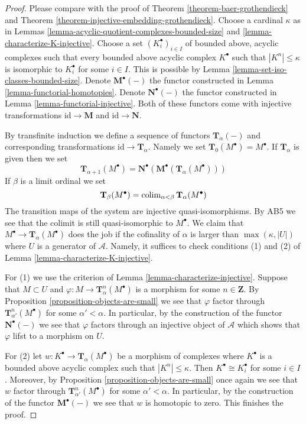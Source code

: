 \begin{proof}
Please compare with the proof of
Theorem \ref{theorem-baer-grothendieck}
and
Theorem \ref{theorem-injective-embedding-grothendieck}.
Choose a cardinal $\kappa$ as in
Lemmas \ref{lemma-acyclic-quotient-complexes-bounded-size} and
\ref{lemma-characterize-K-injective}.
Choose a set $(K_i^\bullet)_{i \in I}$
of bounded above, acyclic complexes
such that every bounded above acyclic complex $K^\bullet$
such that $|K^n| \leq \kappa$ is isomorphic to $K_i^\bullet$ for some
$i \in I$. This is possible by
Lemma \ref{lemma-set-iso-classes-bounded-size}.
Denote $\mathbf{M}^\bullet(-)$ the functor constructed in
Lemma \ref{lemma-functorial-homotopies}.
Denote $\mathbf{N}^\bullet(-)$ the functor constructed in
Lemma \ref{lemma-functorial-injective}.
Both of these functors come with injective transformations
$\text{id} \to \mathbf{M}$ and $\text{id} \to \mathbf{N}$.

\medskip\noindent
By transfinite induction we define a sequence of functors
$\mathbf{T}_\alpha(-)$ and corresponding transformations
$\text{id} \to \mathbf{T}_\alpha$. Namely we set
$\mathbf{T}_0(M^\bullet) = M^\bullet$. If $\mathbf{T}_\alpha$ is
given then we set
$$
\mathbf{T}_{\alpha + 1}(M^\bullet) =
\mathbf{N}^\bullet(\mathbf{M}^\bullet(\mathbf{T}_\alpha(M^\bullet)))
$$
If $\beta$ is a limit ordinal we set
$$
\mathbf{T}_\beta(M^\bullet) =
\mathop{\rm colim}\nolimits_{\alpha < \beta} \mathbf{T}_\alpha(M^\bullet)
$$
The transition maps of the system are injective quasi-isomorphisms.
By AB5 we see that the colimit is still quasi-isomorphic to $M^\bullet$.
We claim that $M^\bullet \to \mathbf{T}_\alpha(M^\bullet)$
does the job if the cofinality of $\alpha$ is larger than
$\max(\kappa, |U|)$ where $U$ is a generator of $\mathcal{A}$.
Namely, it suffices to check conditions (1) and (2) of
Lemma \ref{lemma-characterize-K-injective}.

\medskip\noindent
For (1) we use the criterion of
Lemma \ref{lemma-characterize-injective}.
Suppose that $M \subset U$ and $\varphi : M \to \mathbf{T}^n_\alpha(M^\bullet)$
is a morphism for some $n \in \mathbf{Z}$. By
Proposition \ref{proposition-objects-are-small}
we see that $\varphi$ factor through
$\mathbf{T}^n_{\alpha'}(M^\bullet)$ for some $\alpha' < \alpha$.
In particular, by the construction of the functor
$\mathbf{N}^\bullet(-)$ we see that $\varphi$ factors through
an injective object of $\mathcal{A}$ which shows that $\varphi$
lifst to a morphism on $U$.

\medskip\noindent
For (2) let $w : K^\bullet  \to \mathbf{T}_\alpha(M^\bullet)$
be a morphism of complexes where $K^\bullet$ is a bounded above acyclic
complex such that $|K^n| \leq \kappa$. Then $K^\bullet \cong K_i^\bullet$
for some $i \in I$. Moreover, by
Proposition \ref{proposition-objects-are-small}
once again we see that $w$ factor through
$\mathbf{T}^n_{\alpha'}(M^\bullet)$ for some $\alpha' < \alpha$.
In particular, by the construction of the functor
$\mathbf{M}^\bullet(-)$ we see that $w$ is homotopic to zero.
This finishes the proof.
\end{proof}

